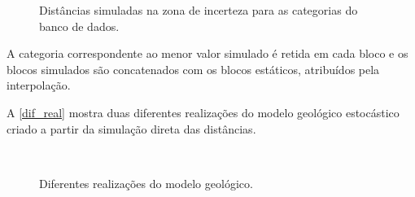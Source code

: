 \begin{figure} 
    \caption{Distâncias simuladas na zona de incerteza para as categorias do banco de dados.} \label{dist_sim_u}
     \centering
\end{figure}

A categoria correspondente ao menor valor simulado é retida em cada bloco e os blocos simulados são concatenados com os blocos estáticos, atribuídos pela interpolação.

A \autoref{dif_real} mostra duas diferentes realizações do modelo geológico estocástico criado a partir da simulação direta das distâncias.

\begin{figure}[t]
\caption{Diferentes realizações do modelo geológico.} 
\label{dif_real}
\begin{center}
\\
\end{center}
\begin{center}
\end{center}
\end{figure}

